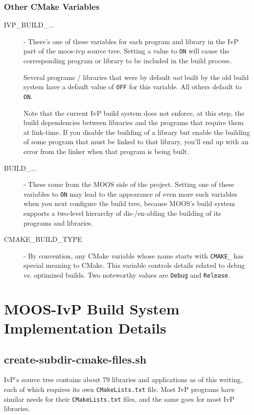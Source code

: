 \documentclass[letterpaper,10pt]{article}
\begin{document}
\subsubsection{Other CMake Variables}
\begin{description}
 \item[IVP\_BUILD\_...] - There's one of these variables for each program and library
	in the IvP part of the moos-ivp source tree.  Setting a value to \verb|ON| will
	cause the corresponding program or library to be included in the build process.

	Several programs / libraries that were by default \textit{not} built by the
	old build system have a default value of \verb|OFF| for this variable.  All others
	default to \verb|ON|.

	Note that the current IvP build system does not enforce, at this step, 
	the build dependencies between libraries and the programs that require them at
	link-time.  If you disable the building of a library but enable the building
	of some program that must be linked to that library, you'll end up with an error
	from the linker when that program is being built.

 \item[BUILD\_...] - These come from the MOOS side of the project.  Setting one of these
	variables to \verb|ON| may lead to the appearance of even more such variables
	when you next configure the build tree, because MOOS's build system supports
	a two-level hierarchy of dis-/en-abling the building of its programs and libraries.

 \item[CMAKE\_BUILD\_TYPE] - By convention, any CMake variable whose name starts with
	\verb|CMAKE_| has special meaning to CMake.  This variable controls details related
	to debug vs. optimized builds.  Two noteworthy values are \verb|Debug| and \verb|Release|.

 \end{description}


\section{MOOS-IvP Build System Implementation Details}

\subsection{create-subdir-cmake-files.sh}
IvP's source tree contains about 79 libraries and applications as of this writing, each of
which requires its own \verb|CMakeLists.txt| file.  Most IvP programs have similar needs
for their \verb|CMakeLists.txt| files, and the same goes for most IvP libraries.
\end{document}
